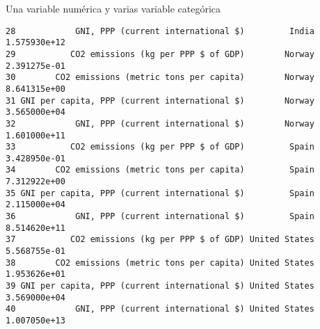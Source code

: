 \documentclass[xcolor={usenames,svgnames,dvipsnames}]{beamer}
\begin{document}
\begin{frame}[fragile,label=sec-2-2-3]{Una variable numérica y varias variable categórica}
\begin{verbatim}
28            GNI, PPP (current international $)         India 1.575930e+12
29           CO2 emissions (kg per PPP $ of GDP)        Norway 2.391275e-01
30        CO2 emissions (metric tons per capita)        Norway 8.641315e+00
31 GNI per capita, PPP (current international $)        Norway 3.565000e+04
32            GNI, PPP (current international $)        Norway 1.601000e+11
33           CO2 emissions (kg per PPP $ of GDP)         Spain 3.428950e-01
34        CO2 emissions (metric tons per capita)         Spain 7.312922e+00
35 GNI per capita, PPP (current international $)         Spain 2.115000e+04
36            GNI, PPP (current international $)         Spain 8.514620e+11
37           CO2 emissions (kg per PPP $ of GDP) United States 5.568755e-01
38        CO2 emissions (metric tons per capita) United States 1.953626e+01
39 GNI per capita, PPP (current international $) United States 3.569000e+04
40            GNI, PPP (current international $) United States 1.007050e+13
\end{verbatim}
\end{frame}
\end{document}
